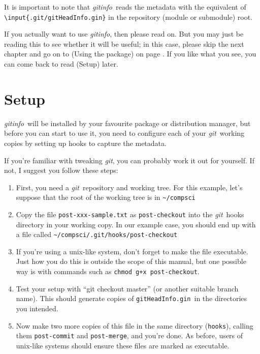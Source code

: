 \documentclass[a4paper,12pt,twoside,openany]{memoir}
\newcommand{\sfit}[1]{\textit{#1}}
\newcommand{\git}{\sfit{git}}
\newcommand{\tpname}{\sfit{gitinfo}}
\newcommand{\ginname}{gitHeadInfo.gin}
\newcommand{\metaname}{\texttt{\ginname}}
\begin{document}
It is important to note that \tpname\ reads the metadata
with the equivalent of \texttt{\textbackslash input\{.git/\ginname\}}
in the repository (module or submodule) root.

If you actually want to use \tpname, then please read on.
But you may just be reading this to see whether it will be useful;
in this case,
please skip the next chapter and go on to (Using the package)
on page \pageref{ch:using}.
If you like what you see, you can come back to
read (Setup) later.

\chapter{Setup}
\tpname\ will be installed by your favourite package or distribution manager,
but before you can start to use it,
you need to configure each of your \git\ working copies
by setting up hooks to capture the metadata.

If you're familiar with tweaking \git, you can probably work it out for yourself.
If not, I suggest you follow these steps:

\begin{enumerate}

\item First, you need a \git\ repository and working tree.
For this example, let's suppose that the root of the working tree is in
\texttt{\textasciitilde/compsci}

\item Copy the file \texttt{post-xxx-sample.txt} as \texttt{post-checkout}
into the \git\ hooks directory in your working copy.
In our example case, you should end up with a file called
\texttt{\textasciitilde/compsci/.git/hooks/post-checkout}

\item If you're using a unix-like system,
don't forget to make the file executable.
Just how you do this is outside the scope of this manual,
but one possible way is with commands such as \verb!chmod g+x post-checkout!.

\item Test your setup with ``git checkout master''
(or another suitable branch name).
This should generate copies of \metaname\ in the directories
you intended.

\item Now make two more copies of this file in the same directory (\texttt{hooks}), calling them
\texttt{post-commit} and \texttt{post-merge}, and you're done.
As before, users of unix-like systems should ensure these files are marked as executable.
\end{enumerate}
\end{document}
